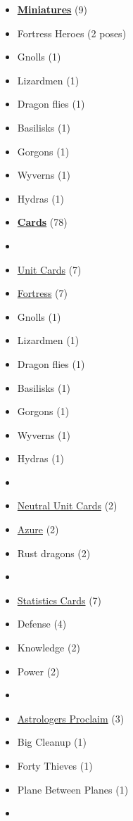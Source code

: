 \begin{multicols}{3}
\begin{itemize}[leftmargin=0pt, label={}, noitemsep, noitemsep]
  \item \textbf{\underline{Miniatures}} (9)
  \item Fortress Heroes (2 poses)
  \item Gnolls (1)
  \item Lizardmen (1)
  \item Dragon flies (1)
  \item Basilisks (1)
  \item Gorgons (1)
  \item Wyverns (1)
  \item Hydras (1)
\end{itemize}

\columnbreak

\begin{itemize}[leftmargin=0pt, label={}, noitemsep, noitemsep]
  \item \textbf{\underline{Cards}} (78)
  \item
  \item \underline{Unit Cards} (7)
  \item \underline{Fortress} (7)
  \item Gnolls (1)
  \item Lizardmen (1)
  \item Dragon flies (1)
  \item Basilisks (1)
  \item Gorgons (1)
  \item Wyverns (1)
  \item Hydras (1)
  \item
  \item \underline{Neutral Unit Cards} (2)
  \item \underline{Azure} (2)
  \item Rust dragons (2)
  \item
  \item \underline{Statistics Cards} (7)
  \item Defense (4)
  \item Knowledge (2)
  \item Power (2)
  \item
  \item \underline{Astrologers Proclaim} (3)
  \item Big Cleanup (1)
  \item Forty Thieves (1)
  \item Plane Between Planes (1)
  \item

\end{itemize}
\end{multicols}
